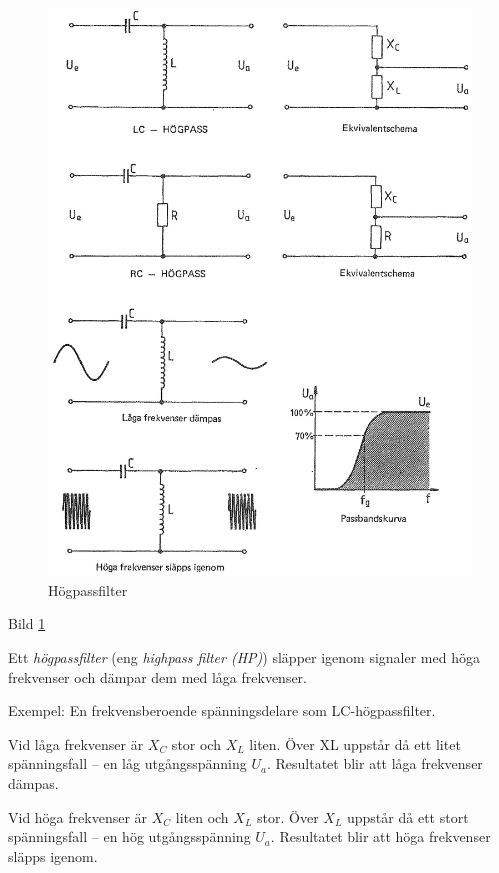 \begin{figure}
\includegraphics[width=\textwidth]{images/bild_2_3-22.png}
\caption{Högpassfilter}
\label{fig:BildII3-22}
\end{figure}

Bild \ref{fig:BildII3-22}

Ett \emph{högpassfilter} (eng \emph{highpass filter (HP)}) släpper igenom
signaler med höga frekvenser och dämpar dem med låga frekvenser.

Exempel: En frekvensberoende spänningsdelare som LC-högpassfilter.

Vid låga frekvenser är \(X_C\) stor och \(X_L\) liten. Över XL uppstår då ett
litet spänningsfall -- en låg utgångsspänning \(U_a\). Resultatet blir att
låga frekvenser dämpas.

Vid höga frekvenser är \(X_C\) liten och \(X_L\) stor. Över \(X_L\) uppstår då
ett stort spänningsfall -- en hög utgångsspänning \(U_a\). Resultatet blir att
höga frekvenser släpps igenom.

